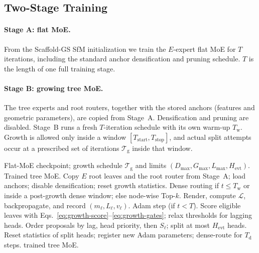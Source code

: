 \subsection{Two-Stage Training}
\label{sec:recipe}

\paragraph{Stage A: flat MoE.}
From the Scaffold-GS SfM initialization we train the $E$-expert flat MoE for $T$ iterations, including the standard anchor densification and pruning schedule.
$T$ is the length of one full training stage.

\paragraph{Stage B: growing tree MoE.}
The tree experts and root routers, together with the stored anchors (features and geometric parameters), are copied from Stage~A.
Densification and pruning are disabled.
Stage~B runs a fresh $T$-iteration schedule with its own warm-up $T_{\mathrm{w}}$.
Growth is allowed only inside a window $[T_{\mathrm{start}},T_{\mathrm{stop}}]$, and actual split attempts occur at a prescribed set of iterations $\mathcal{T}_{\mathrm{g}}$ inside that window.

\begin{algorithm}[t]
\caption{Growing Tree MoE (Stage B)}
\label{alg:tree}
\small
\begin{algorithmic}[1]
\Require Flat-MoE checkpoint; growth schedule $\mathcal{T}_{\mathrm{g}}$ and limits $(D_{\max},G_{\max},L_{\max},H_{\mathrm{evt}})$.
\Ensure Trained tree MoE.
\State Copy $E$ root leaves and the root router from Stage~A; load anchors; disable densification; reset growth statistics.
  \State Dense routing if $t\le T_{\mathrm{w}}$ or inside a post-growth dense window; else node-wise Top-$k$.
  \State Render, compute $\mathcal{L}$, backpropagate, and record $(m_{\ell},L_{\ell},v_{\ell})$.
  \State Adam step (if $t<T$).
    \State Score eligible leaves with Eqs.~\eqref{eq:growth-score}--\eqref{eq:growth-gates}; relax thresholds for lagging heads.
    \State Order proposals by lag, head priority, then $S_{\ell}$; split at most $H_{\mathrm{evt}}$ heads.
      \State Reset statistics of split heads; register new Adam parameters; dense-route for $T_{\mathrm{d}}$ steps.
    \EndIf
  \EndIf
\EndFor
\State \Return trained tree MoE.
\end{algorithmic}
\end{algorithm}

